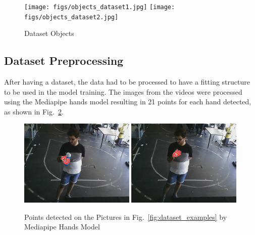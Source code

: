 \begin{figure}[H]
    \centerline{\texttt{[image: figs/objects\_dataset1.jpg]} \texttt{[image: figs/objects\_dataset2.jpg]}}
    \caption[Dataset Objects]{Dataset Objects}
    \label{fig:dataset_objects}
\end{figure}

\subsection{Dataset Preprocessing}

After having a dataset, the data had to be processed to have a fitting structure to be used in the model training. The images from the videos were processed using the Mediapipe hands model resulting in 21 points for each hand detected, as shown in Fig.~\ref{fig:dataset_examples2}.

\begin{figure}[H]
    \centerline{\includegraphics[width=0.49\textwidth]{figs/dataset_preprocessing2_1.png} \includegraphics[width=0.49\textwidth]{figs/dataset_preprocessing2_2.png}}
    \caption[Points detected on the Pictures in Fig.~\ref{fig:dataset_examples} by Mediapipe Hands Model]{Points detected on the Pictures in Fig.~\ref{fig:dataset_examples} by Mediapipe Hands Model}
    \label{fig:dataset_examples2}
\end{figure}

